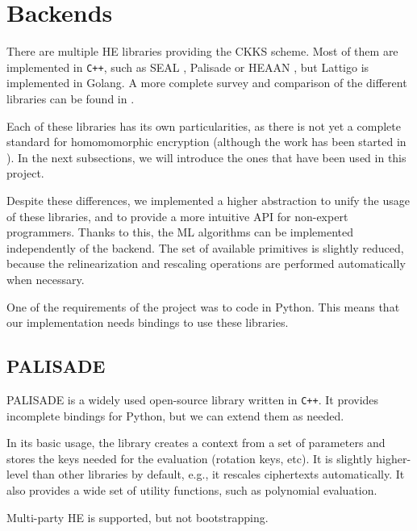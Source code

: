 \documentclass[a4paper,11pt,oneside]{report}
\begin{document}

\section{Backends}

There are multiple HE libraries providing the CKKS scheme. Most of them are implemented in \texttt{C++}, such as SEAL \cite{microsoft_corporation_microsoft_2022}, Palisade \cite{palisade_palisade_2022} or HEAAN \cite{cryptolab_inc_heaan_2022}, but Lattigo \cite{tune_insight_sa_lattigo_2022} is implemented in Golang. A more complete survey and comparison of the different libraries can be found in \cite{viand_sok_2021}.

Each of these libraries has its own particularities, as there is not yet a complete standard for homomomorphic encryption (although the work has been started in \cite{albrecht_homomorphic_2021}). In the next subsections, we will introduce the ones that have been used in this project.

Despite these differences, we implemented a higher abstraction to unify the usage of these libraries, and to provide a more intuitive API for non-expert programmers. Thanks to this, the ML algorithms can be implemented independently of the backend. The set of available primitives is slightly reduced, because the relinearization and rescaling operations are performed automatically when necessary.

One of the requirements of the project was to code in Python. This means that our implementation needs bindings to use these libraries.

\subsection{PALISADE}

PALISADE is a widely used open-source library written in \texttt{C++}. It provides incomplete bindings for Python, but we can extend them as needed. 

In its basic usage, the library creates a context from a set of parameters and stores the keys needed for the evaluation (rotation keys, etc). It is slightly higher-level than other libraries by default, e.g., it rescales ciphertexts automatically. It also provides a wide set of utility functions, such as polynomial evaluation.

Multi-party HE is supported, but not bootstrapping.
\end{document}
